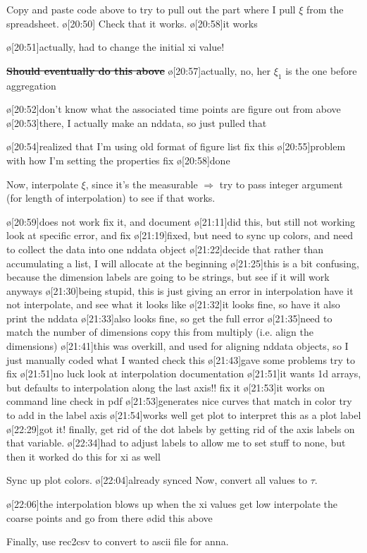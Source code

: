 Copy and paste code above to try to pull out the part where I pull $\xi$ from the spreadsheet.
\o[20:50]{}
Check that it works.
\o[20:58]{it works}
\begin{err}
    \o[20:51]{actually, had to change the initial xi value!}
    \begin{err}
        \sout{ {\bf Should eventually do this above} }
        \o[20:57]{actually, no, her $\xi_1$ is the one before aggregation}
    \end{err}
    \o[20:52]{don't know what the associated time points are}
    figure out from above
    \o[20:53]{there, I actually make an nddata, so just pulled that}
    \begin{err}
        \o[20:54]{realized that I'm using old format of figure list}
        fix this
        \o[20:55]{problem with how I'm setting the properties}
        fix
        \o[20:58]{done}
    \end{err}
\end{err}
Now, interpolate $\xi$, since it's the measurable $\Rightarrow$ try to pass integer argument (for length of interpolation) to see if that works.
\begin{err}
    \o[20:59]{does not work}
    fix it, and document
    \o[21:11]{did this, but still not working}
    look at specific error, and fix
    \o[21:19]{fixed, but need to sync up colors, and need to}
    collect the data into one nddata object
    \o[21:22]{decide that rather than accumulating a list, I will}
    allocate at the beginning
    \o[21:25]{this is a bit confusing, because the dimension labels are going to be strings, but see if it will work anyways}
    \o[21:30]{being stupid, this is just giving an error in interpolation}
    have it not interpolate, and see what it looks like
    \o[21:32]{it looks fine, so have it} also print the nddata
    \o[21:33]{also looks fine, so} get the full error
    \o[21:35]{need to match the number of dimensions}
    copy this from multiply (i.e. align the dimensions)
    \o[21:41]{this was overkill, and used for aligning nddata objects, so I just manually coded what I wanted}
    check this
    \o[21:43]{gave some problems} try to fix
    \o[21:51]{no luck} look at interpolation documentation
    \o[21:51]{it wants 1d arrays, but defaults to interpolation along the last axis!!}
    fix it
    \o[21:53]{it works on command line}
    check in pdf
    \o[21:53]{generates nice curves that match in color}
    try to add in the label axis
    \o[21:54]{works well}
    get plot to interpret this as a plot label
    \o[22:29]{got it!}
    finally, get rid of the dot labels by getting rid of the axis labels on that variable.
    \o[22:34]{had to adjust labels to allow me to set stuff to none, but then it worked}
    do this for xi as well
\end{err}
Sync up plot colors.
\o[22:04]{already synced}
Now, convert all values to $\tau$.
\begin{err}
    \o[22:06]{the interpolation blows up when the xi values get low}
    interpolate the coarse points and go from there
    \o{did this above}
\end{err}
Finally, use rec2csv to convert to ascii file for anna.

